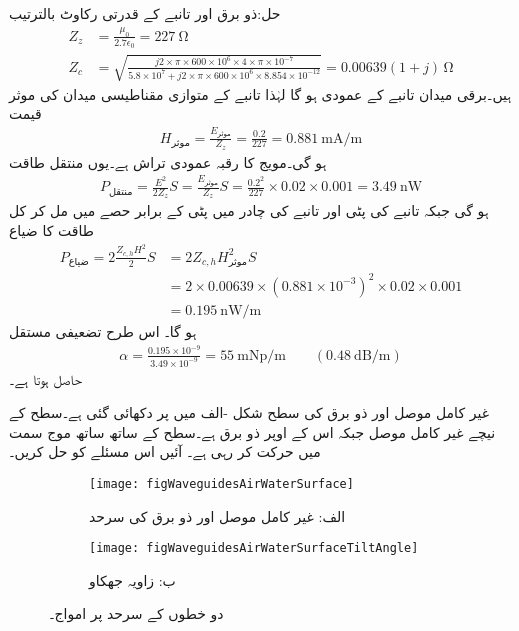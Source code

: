 حل:ذو برق  اور تانبے کے قدرتی رکاوٹ بالترتیب
\begin{align*}
Z_z&=\frac{\mu_0}{2.7 \epsilon_0}=\SI{227}{\ohm}\\
Z_c&=\sqrt{\frac{j 2 \times \pi \times 600 \times 10^{6} \times 4 \times \pi \times 10^{-7}}{5.8\times 10^{7}+j 2\times \pi \times 600 \times 10^{6} \times 8.854 \times 10^{-12}}}=0.00639(1+j) \, \si{\ohm}
\end{align*}
ہیں۔برقی میدان تانبے کے عمودی ہو گا لہٰذا تانبے کے متوازی مقناطیسی میدان کی موثر قیمت
\begin{align*}
H_{\text{موثر}} = \frac{E_{\text{موثر}}}{Z_z} =\frac{0.2}{227}=\SI{0.881}{\milli \ampere\per\meter}
\end{align*}
ہو گی۔مویج کا رقبہ عمودی تراش  ہے۔یوں   منتقل طاقت
\begin{align*}
P_{\text{منتقل}}=\frac{E^2}{2 Z_z}  S=\frac{E_{\text{موثر}}}{Z_z}  S=\frac{0.2^2}{227}\times 0.02 \times 0.001 =\SI{3.49}{\nano\watt}
\end{align*}
 ہو گی جبکہ تانبے کی پٹی اور تانبے کی چادر  میں پٹی کے برابر حصے میں مل کر کل طاقت کا ضیاع
\begin{align*}
P_{\text{ضیاع}}= 2\frac{Z_{c,h} H^2}{2} S &=2Z_{c,h} H^2_{\text{موثر}} S \\
&=2\times 0.00639 \times \left(0.881 \times 10^{-3}\right)^2 \times 0.02\times 0.001 \\
&=\SI{0.195}{\nano\watt\per\meter}
\end{align*}
ہو گا۔ اس طرح تضعیفی مستقل
\begin{align*}
\alpha=\frac{0.195\times 10^{-9}}{3.49\times 10^{-9}}=\SI{55}{\milli\neper\per\meter} \quad \quad \left(\SI{0.48}{\deci\bel\per\meter}\right)
\end{align*}
حاصل ہوتا ہے۔

غیر کامل موصل اور ذو برق کی سطح شکل -الف میں   پر دکھائی گئی ہے۔سطح کے نیچے   غیر کامل موصل جبکہ اس کے اوپر  ذو برق ہے۔سطح کے ساتھ ساتھ  موج   سمت میں حرکت کر رہی ہے۔ آئیں اس مسئلے کو حل کریں۔

\begin{figure}
\centering
\begin{subfigure}{0.5\textwidth}
\centering
\texttt{[image: figWaveguidesAirWaterSurface]}
\caption*{الف: غیر کامل موصل اور ذو برق کی سرحد}
\end{subfigure}%
%
\begin{subfigure}{0.5\textwidth}
\centering
\texttt{[image: figWaveguidesAirWaterSurfaceTiltAngle]}
\caption*{ب: زاویہ جھکاو}
\end{subfigure}%
\caption{دو خطوں کے سرحد پر امواج۔}
\label{شکل_مویج_ہوا_غیر_کامل_ذو_برق_سرحد}
\end{figure}

